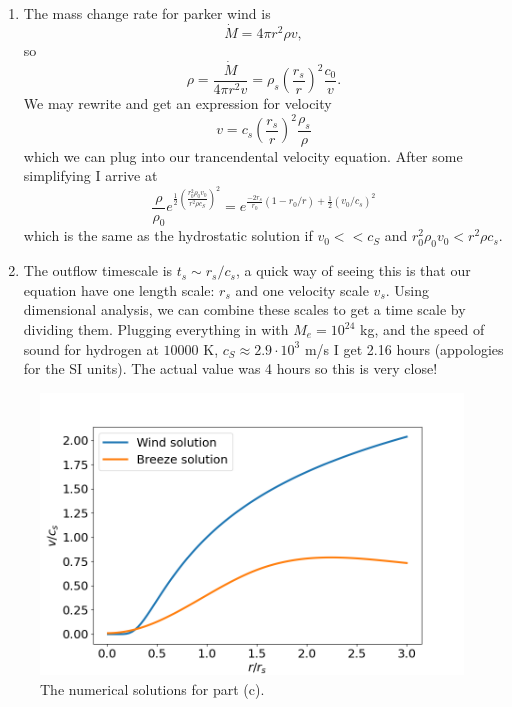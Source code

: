 \documentclass[11pt]{article}
\begin{document}
\begin{enumerate}[label=\alph*)]
 \item

  The mass change rate for parker wind is
  \begin{equation}
   \dot{M} = 4 \pi r^2 \rho v,
  \end{equation}
  so
  \begin{equation}
    \rho = \frac{\dot{M}}{4 \pi r^2 v} = \rho_s \left ( \frac{r_s}{r} \right )^2 \frac{c_0}{v}.
  \end{equation}
  We may rewrite and get an expression for velocity
  \begin{equation}
    v = c_s \left ( \frac{r_s}{r} \right )^2 \frac{\rho_s}{\rho}
  \end{equation}
  which we can plug into our trancendental velocity equation.
  After some simplifying I arrive at
  \begin{equation}
    \frac{\rho}{\rho_0} e^{\frac{1}{2} \left( \frac{r_0^2 \rho_0 v_0}{r^2 \rho c_S} \right)^2} = e^{\frac{-2 r_s}{r_0}(1-r_0/r) + \frac{1}{2}\left(  v_0 / c_s\right)^2}
  \end{equation}
  which is the same as the hydrostatic solution if $v_0 << c_S$ and $r_0^2 \rho_0 v_0 < r^2 \rho c_s$.
 \item
  The outflow timescale is $t_s \sim r_s/c_s$, a quick way of seeing this is that our equation have one length scale: $r_s$ and one velocity scale $v_s$.
  Using dimensional analysis, we can combine these scales to get a time scale by dividing them.
  Plugging everything in with $M_e = 10^{24}$ kg, and the speed of sound for hydrogen at $10000$ K, $c_S \approx 2.9 \cdot 10^3$ m/s I get 2.16 hours (appologies for the SI units).
  The actual value was 4 hours so this is very close!


\end{enumerate}

\begin{figure}[htbp]
\centering
\includegraphics[width=.9\linewidth]{../plots/windbreeze.png}
\caption{\label{fig:problem2c}The numerical solutions for part (c).}
\end{figure}
\end{document}
